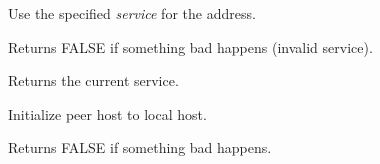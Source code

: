 Use the specified {\it service} for the address.


Returns FALSE if something bad happens (invalid service).

%
%



Returns the current service.

%
%



Initialize peer host to local host.


Returns FALSE if something bad happens.

